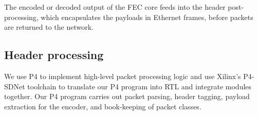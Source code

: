 The encoded or decoded output of the FEC core feeds into the header
post-processing, which encapsulates the payloads in Ethernet frames, before packets are returned to the network.

\subsection{Header processing}
\label{sec:impl:header-processing}
We use P4 to implement high-level packet processing logic and
use Xilinx's P4-SDNet toolchain to translate our P4 program into RTL
and integrate modules together.
%
%
%
%
Our P4 program carries out packet parsing, header tagging,
payload extraction for the encoder, and
book-keeping of packet classes.

